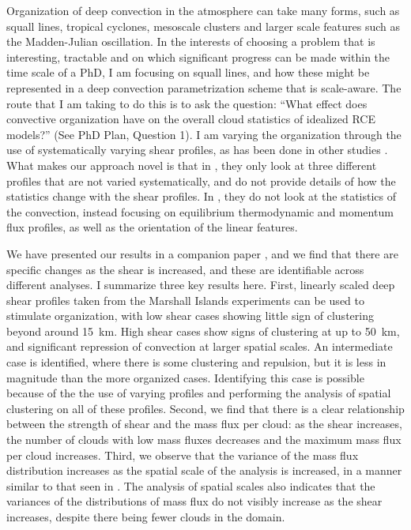 \documentclass[11pt,a4paper]{article}
\begin{document}
Organization of deep convection in the atmosphere can take many forms, such as squall lines, tropical cyclones, mesoscale clusters and larger scale features such as the Madden-Julian oscillation. In the interests of choosing a problem that is interesting, tractable and on which significant progress can be made within the time scale of a PhD, I am focusing on squall lines, and how these might be represented in a deep convection parametrization scheme that is scale-aware. The route that I am taking to do this is to ask the question: ``What effect does convective organization have on the overall cloud statistics of idealized RCE models?'' (See PhD Plan, Question 1). I am varying the organization through the use of systematically varying shear profiles, as has been done in other studies \parencite{RE2001, cohen2006fluctuations}. What makes our approach novel is that in \cite{cohen2006fluctuations}, they only look at three different profiles that are not varied systematically, and do not provide details of how the statistics change with the shear profiles. In \cite{RE2001}, they do not look at the statistics of the convection, instead focusing on equilibrium thermodynamic and momentum flux profiles, as well as the orientation of the linear features. 

We have presented our results in a companion paper \parencite{muetz2017effects}, and we find that there are specific changes as the shear is increased, and these are identifiable across different analyses. I summarize three key results here. First, linearly scaled deep shear profiles taken from the Marshall Islands experiments \cite{yanai1973determination} can be used to stimulate organization, with low shear cases showing little sign of clustering beyond around \SI{15}{km}. High shear cases show signs of clustering at up to \SI{50}{km}, and significant repression of convection at larger spatial scales. An intermediate case is identified, where there is some clustering and repulsion, but it is less in magnitude than the more organized cases. Identifying this case is possible because of the the use of varying profiles and performing the analysis of spatial clustering on all of these profiles. Second, we find that there is a clear relationship between the strength of shear and the mass flux per cloud: as the shear increases, the number of clouds with low mass fluxes decreases and the maximum mass flux per cloud increases. Third, we observe that the variance of the mass flux distribution increases as the spatial scale of the analysis is increased, in a manner similar to that seen in \cite{plant2008stochastic}. The analysis of spatial scales also indicates that the variances of the distributions of mass flux do not visibly increase as the shear increases, despite there being fewer clouds in the domain.
\end{document}
